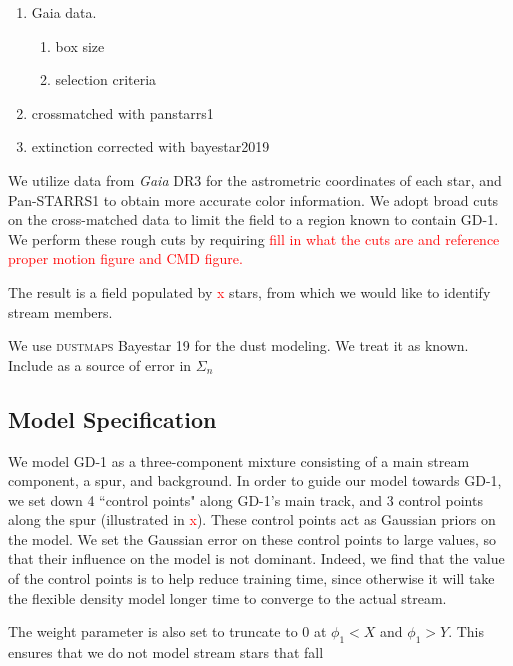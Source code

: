 \documentclass[twocolumn]{aastex631}
\newcommand{\package}[1]{\textsc{#1}}
\newcommand{\TODO}[1]{{\textcolor{red}{#1}}}
\newcommand{\JN}[1]{\TODO{#1}}
\begin{document}
        \begin{enumerate}
            \item Gaia data.
                \begin{enumerate}
                    \item box size
                    \item selection criteria
                \end{enumerate}
            \item crossmatched with panstarrs1
            \item extinction corrected with bayestar2019
        \end{enumerate}

        We utilize data from {\it Gaia} DR3 for the astrometric coordinates of each star, and Pan-STARRS1 to obtain more accurate color information. We adopt broad cuts on the cross-matched data to limit the field to a region known to contain GD-1. We perform these rough cuts by requiring \JN{fill in what the cuts are and reference proper motion figure and CMD figure.} 

        The result is a field populated by \JN{x} stars, from which we would like to identify stream members.

            We use \package{dustmaps} Bayestar 19 for the dust modeling. We treat it as known. Include as a source of error in $\Sigma_n$

    \subsection{Model Specification}\label{sec:GD_1_ModelSpecification}
    
        We model GD-1 as a three-component mixture consisting of a main stream component, a spur, and background. In order to guide our model towards GD-1, we set down 4 ``control points" along GD-1's main track, and 3 control points along the spur (illustrated in \JN{x}). These control points act as Gaussian priors on the model. We set the Gaussian error on these control points to large values, so that their influence on the model is not dominant. Indeed, we find that the value of the control points is to help reduce training time, since otherwise it will take the flexible density model longer time to converge to the actual stream.

        The weight parameter is also set to truncate to $0$ at $\phi_1 < X$ and $\phi_1 > Y$. This ensures that we do not model stream stars that fall 
    
\end{document}
